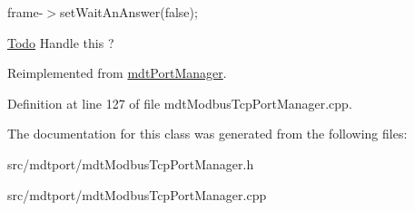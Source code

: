 frame-\/$>$setWaitAnAnswer(false);

\begin{Desc}
\item[\hyperlink{todo__todo000021}{Todo}]Handle this ? \end{Desc}




Reimplemented from \hyperlink{classmdt_port_manager_a8b60d53d6e553f15dedec916f9c1614b}{mdtPortManager}.



Definition at line 127 of file mdtModbusTcpPortManager.cpp.



The documentation for this class was generated from the following files:\begin{DoxyCompactItemize}
\item 
src/mdtport/mdtModbusTcpPortManager.h\item 
src/mdtport/mdtModbusTcpPortManager.cpp\end{DoxyCompactItemize}

